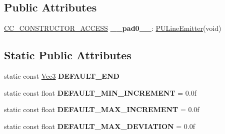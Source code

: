 \subsection*{Public Attributes}
\begin{DoxyCompactItemize}
\item 
\mbox{\label{classPULineEmitter_ac237736fbe2c087aa328ffd29ab58419}} 
\hyperlink{_2cocos2d_2cocos_2base_2ccConfig_8h_a25ef1314f97c35a2ed3d029b0ead6da0}{C\+C\+\_\+\+C\+O\+N\+S\+T\+R\+U\+C\+T\+O\+R\+\_\+\+A\+C\+C\+E\+SS} {\bfseries \+\_\+\+\_\+pad0\+\_\+\+\_\+}\+: \hyperlink{classPULineEmitter}{P\+U\+Line\+Emitter}(void)
\end{DoxyCompactItemize}
\subsection*{Static Public Attributes}
\begin{DoxyCompactItemize}
\item 
\mbox{\label{classPULineEmitter_accaa45590d6ebfd90e4439d576fd2a5f}} 
static const \hyperlink{classVec3}{Vec3} {\bfseries D\+E\+F\+A\+U\+L\+T\+\_\+\+E\+ND}
\item 
\mbox{\label{classPULineEmitter_a3f80e09891ac9a0cdf7672f62defe9f9}} 
static const float {\bfseries D\+E\+F\+A\+U\+L\+T\+\_\+\+M\+I\+N\+\_\+\+I\+N\+C\+R\+E\+M\+E\+NT} = 0.\+0f
\item 
\mbox{\label{classPULineEmitter_a063c7bcf3060f67d60427d3ed42de8ca}} 
static const float {\bfseries D\+E\+F\+A\+U\+L\+T\+\_\+\+M\+A\+X\+\_\+\+I\+N\+C\+R\+E\+M\+E\+NT} = 0.\+0f
\item 
\mbox{\label{classPULineEmitter_a024f395cf050530571927e3399a6004b}} 
static const float {\bfseries D\+E\+F\+A\+U\+L\+T\+\_\+\+M\+A\+X\+\_\+\+D\+E\+V\+I\+A\+T\+I\+ON} = 0.\+0f
\end{DoxyCompactItemize}
